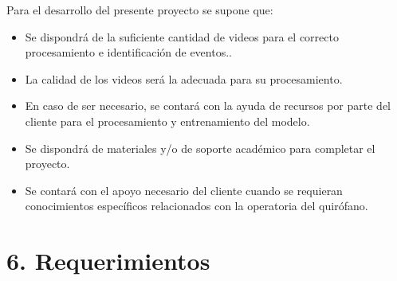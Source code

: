 \documentclass[
11pt, %
]{charter}
\begin{document}
Para el desarrollo del presente proyecto se supone que: 

\begin{itemize}
	\item Se dispondrá de la suficiente cantidad de videos para el correcto procesamiento e identificación de eventos..
	\item La calidad de los videos será la adecuada para su procesamiento.
	\item En caso de ser necesario, se contará con la ayuda de recursos por parte del cliente para el procesamiento y entrenamiento del modelo.
	\item Se dispondrá de materiales y/o de soporte académico para completar el proyecto.
	\item Se contará con el apoyo necesario del cliente cuando se requieran conocimientos específicos relacionados con la operatoria del quirófano.
\end{itemize}


\section{6. Requerimientos}
\label{sec:requerimientos}
\end{document}
